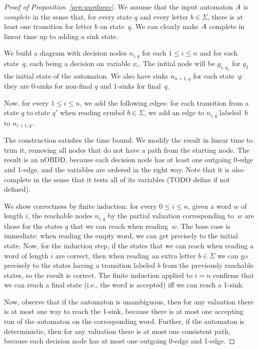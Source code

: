 \begin{proof}[Proof of Proposition~\ref{prp:wordprov}]
  We assume that the input automaton $A$ is \emph{complete} in the sense that,
  for every state $q$ and every letter $b \in \Sigma$, there is at least one
  transition for letter $b$ on state~$q$. We can clearly make $A$ complete in
  linear time up to adding a sink state.

  We build a diagram with decision nodes $n_{i,q}$ for each $1 \leq i \leq n$ and
  for each state~$q$, each being a decision on variable $x_i$.
  The initial node will be $g_{1, q_I}$ for $q_I$ the
  initial state of the automaton. We also have sinks $n_{n+1,q}$ for each
  state~$q$: they
  are 0-sinks for non-final $q$ and 1-sinks for final~$q$.

  Now, for every $1 \leq i \leq n$, we add the following edges: for each
  transition from a state $q$ to state $q'$ when reading symbol $b \in \Sigma$,
  we add an edge to $n_{i,q}$ labeled~$b$ to $n_{i+1,q'}$.

  The construction satisfies the time bound. We modify the result in linear time
  to trim it, removing all nodes that do not have a path from the starting node.
  The result is an nOBDD, because
  each decision node has at least one outgoing 0-edge and 1-edge, and the
  variables are ordered in the right way. Note that it is also complete in the
  sense that it tests all of its variables (TODO define if not defined).

  We show correctness by finite induction: for every $0 \leq i \leq n$, given
  a word $w$ of length $i$, the reachable nodes $n_{i,q}$ by the partial
  valuation corresponding to~$w$ are those for the states $q$ that we can reach
  when reading~$w$. The base case is immediate: when reading the empty word, we
  can get precisely to the initial state. Now, for the induction step, if the
  states that we can reach when reading a word of length $i$ are correct, then
  when reading an extra letter $b \in \Sigma$ we can go precisely to the states
  having a transition labeled $b$ from the previously reachable states, so the
  result is correct. The finite induction applied to $i=n$ confirms that we can
  reach a final state (i.e., the word is accepted) iff we can reach a 1-sink.

  Now, observe that if the automaton is unambiguous, then for any valuation
  there is at most one way to reach the 1-sink, because there is at most one
  accepting run of the automaton on the corresponding word. Further, if the
  automaton is deterministic, then for any valuation there is at most one
  consistent path, because each decision node has at most one outgoing 0-edge
  and 1-edge.
\end{proof}

